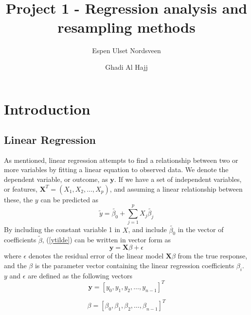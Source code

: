 \documentclass{article}
\title{Project 1 - Regression analysis and resampling methods}
\author{Espen Ulset Nordsveen
\and Ghadi Al Hajj}
\begin{document}
\maketitle
\begin{abstract}

\end{abstract}

\section{Introduction}


\subsection{Linear Regression}
As mentioned, linear regression attempts to find a relationship between two or more variables by fitting a linear equation to observed data. We denote the dependent variable, or outcome, as $\textbf{y}$. If we have a set of independent variables, or features, $\textbf{X}^{T} = (X_{1}, X_{2}, \dots, X_{p})$, and assuming a linear relationship between these, the $y$ can be predicted as
\begin{equation} \label{ytilde}
\tilde{y} = \tilde{\beta_{0}} + \sum_{j=1}^{p} X_{j} \tilde{\beta_{j}}
\end{equation}
By including the constant variable 1 in $X$, and include $\tilde{\beta_{0}}$ in the vector of coefficients $\tilde{\beta}$,  (\ref{ytilde}) can be written in vector form as
\begin{equation}\label{matrixform}
\textbf{y} = \textbf{X} \beta + \epsilon
\end{equation}
where $\epsilon$ denotes the residual error of the linear model $\textbf{X}\beta$ from the true response, and the $\beta$ is the parameter vector containing the linear regression coefficients $\beta_{i}$. $y$ and $\epsilon$ are defined as the following vectors
\begin{equation}
\textbf{y} = [y_{0}, y_{1}, y_{2}, \dots, y_{n-1}]^{T}
\end{equation}

\begin{equation}
\beta = [\beta_{0}, \beta_{1}, \beta_{2}, \dots, \beta_{n-1}]^{T}
\end{equation}
\end{document}
